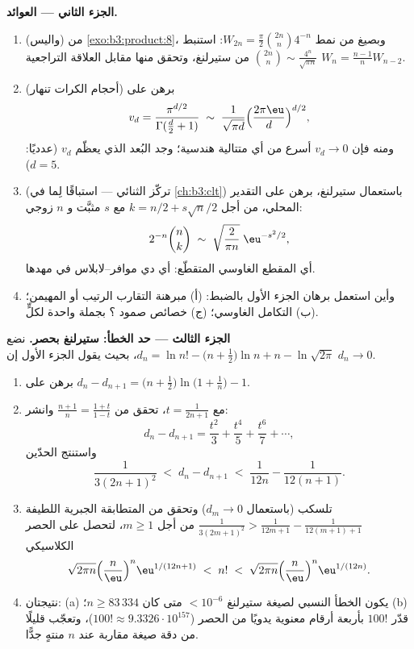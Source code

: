\begin{problem}
\medskip
\noindent\textbf{الجزء الثاني --- العوائد.}
\begin{enumerate}[resume]
  \item (واليس) من \cref{exo:b3:product:8}، وبصيغ من نمط $W_{2n} =
        \frac\pi2\binom{2n}n4^{-n}$: استنبط
        $\binom{2n}{n} \sim \frac{4^n}{\sqrt{\pi n}}$ من ستيرلنغ، وتحقق منها مقابل العلاقة التراجعية
        $W_{n} =
        \frac{n-1}nW_{n-2}$.
  \item (أحجام الكرات تنهار) برهن على
        \[
        v_d = \frac{\pi^{d/2}}{\Gamma(\frac d2 + 1)}
        \;\sim\; \frac{1}{\sqrt{\pi d}}
        \Bigl(\frac{2\pi\eu}{d}\Bigr)^{d/2},
        \]
        ومنه فإن $v_d \to 0$ أسرع من أي متتالية هندسية؛ وجد
        البُعد الذي يعظّم $v_d$ (عدديًا: $d =
        5$).
  \item (تركّز الثنائي --- استباقًا لِما في \cref{ch:b3:clt}) باستعمال
        ستيرلنغ، برهن على التقدير المحلي، من أجل $k = n/2 + s\sqrt n/2$ مع $s$
        مثبَّت و $n$ زوجي:
        \[
        2^{-n}\binom{n}{k} \;\sim\;
        \sqrt{\frac{2}{\pi n}}\;\eu^{-s^2/2},
        \]
        أي المقطع الغاوسي المتقطّع: أي دي موافر--لابلاس في
        مهدها.
  \item وأين استعمل برهان الجزء الأول بالضبط: (أ) مبرهنة
        التقارب الرتيب أو المهيمن؛ (ب) التكامل الغاوسي؛ (ج)
        خصائص صمود ؟ بجملة واحدة لكلٍّ.
\end{enumerate}

\medskip
\noindent\textbf{الجزء الثالث --- حد الخطأ: ستيرلنغ بحصر.} نضع
$d_n = \ln n! - \bigl(n + \tfrac12\bigr)\ln n + n -
\ln\sqrt{2\pi}$، بحيث يقول الجزء الأول إن $d_n \to 0$.
\begin{enumerate}[resume]
  \item برهن على $d_n - d_{n+1} = \bigl(n +
        \tfrac12\bigr)\ln\bigl(1 + \tfrac1n\bigr) - 1$.
  \item مع $t = \frac1{2n+1}$، تحقق من $\frac{n+1}n =
        \frac{1+t}{1-t}$ وانشر:
        \[
        d_n - d_{n+1} = \frac{t^2}3 + \frac{t^4}5 +
        \frac{t^6}7 + \cdots,
        \]
        واستنتج الحدّين
        \[
        \frac1{3(2n+1)^2} \;<\; d_n - d_{n+1} \;<\;
        \frac1{12n} - \frac1{12(n+1)} .
        \]
  \item تلسكب (باستعمال $d_m \to 0$) وتحقق من المتطابقة الجبرية
        اللطيفة $\frac1{3(2m+1)^2} >
        \frac1{12m+1} - \frac1{12(m+1)+1}$ من أجل $m \geq 1$، لتحصل على الحصر
        الكلاسيكي
        \[
        \sqrt{2\pi n}\Bigl(\frac n\eu\Bigr)^n
        \eu^{1/(12n+1)} \;<\; n! \;<\;
        \sqrt{2\pi n}\Bigl(\frac n\eu\Bigr)^n\eu^{1/(12n)} .
        \]
  \item نتيجتان: (a) يكون الخطأ النسبي لصيغة ستيرلنغ
        $< 10^{-6}$ متى كان $n \geq 83\,334$؛ (b) قدّر $100!$
        بأربعة أرقام معنوية يدويًا من الحصر ($100! \approx 9.3326\cdot
        10^{157}$)، وتعجّب
        قليلًا من دقة صيغة مقاربة عند $n$ منتهٍ جدًّا.
\end{enumerate}


\end{problem}
